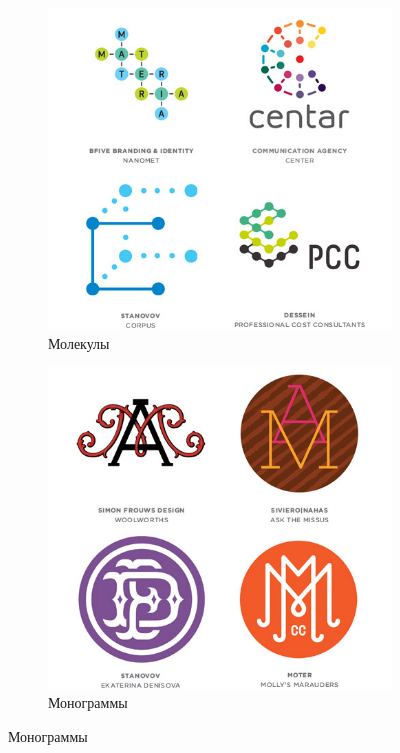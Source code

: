 \begin{figure}[h!]
  \ContinuedFloat
  \centering
  \begin{subfigure}{.45\textwidth}
    \centering
    \includegraphics[width=\linewidth]{images/supplement/logolounge/2013/Molekuli}
    \caption[]{Молекулы}
    \label{fig:logolounge:2013:moleculi}
  \end{subfigure}
  \hfill
  \centering
  \begin{subfigure}{.45\textwidth}
    \centering
    \includegraphics[width=\linewidth]{images/supplement/logolounge/2013/Monogrammi}
    \caption[]{Монограммы}
    \label{fig:logolounge:2013:Monogrammi}
  \end{subfigure}


\end{figure}
